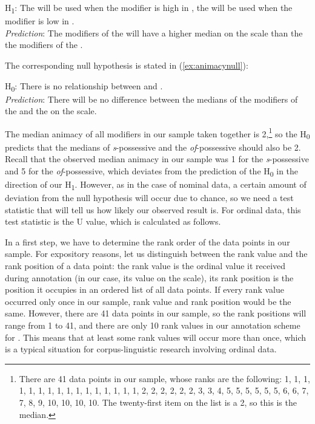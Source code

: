 \begin{exe}
\ex H\textsubscript{1}: The  will be used when the modifier is high in , the  will be used when the modifier is low in . \\
\textit{Prediction}: The modifiers of the  will have a higher median on the  scale than the the modifiers of the .
\label{ex:animacyalternative}
\end{exe}

The corresponding null hypothesis is stated in (\ref{ex:animacynull}):

\begin{exe}
\ex H\textsubscript{0}: There is no relationship between  and . \\
\textit{Prediction}: There will be no difference between the medians of the modifiers of the  and the  on the  scale.
\label{ex:animacynull}
\end{exe}

The median animacy of all modifiers in our sample taken together is 2,\footnote{There are 41 data points in our sample, whose ranks are the following: 1, 1, 1, 1, 1, 1, 1, 1, 1, 1, 1, 1, 1, 1, 1, 1, 2, 2, 2, 2, 2, 2, 3, 3, 4, 5, 5, 5, 5, 5, 5, 6, 6, 7, 7, 8, 9, 10, 10, 10, 10. The twenty-first item on the list is a 2, so this is the median.} so the H\textsubscript{0} predicts that the medians of \textit{s}-possessive and the \textit{of}-possessive should also be 2. Recall that the observed median animacy in our sample was 1 for the \textit{s}-possessive and 5 for the \textit{of}-possessive, which deviates from the prediction of the H\textsubscript{0} in the direction of our H\textsubscript{1}. However, as in the case of nominal data, a certain amount of deviation from the null hypothesis will occur due to chance, so we need a test statistic that will tell us how likely our observed result is. For ordinal data, this test statistic is the U value, which is calculated as follows.

In a first step, we have to determine the rank order of the data points in our sample. For expository reasons, let us distinguish between the rank value and the rank position of a data point: the rank value is the ordinal value it received during annotation (in our case, its value on the  scale), its rank position is the position it occupies in an ordered list of all data points. If every rank value occurred only once in our sample, rank value and rank position would be the same. However, there are 41 data points in our sample, so the rank positions will range from 1 to 41, and there are only 10 rank values in our annotation scheme for . This means that at least some rank values will occur more than once, which is a typical situation for corpus-linguistic research involving ordinal data. 

